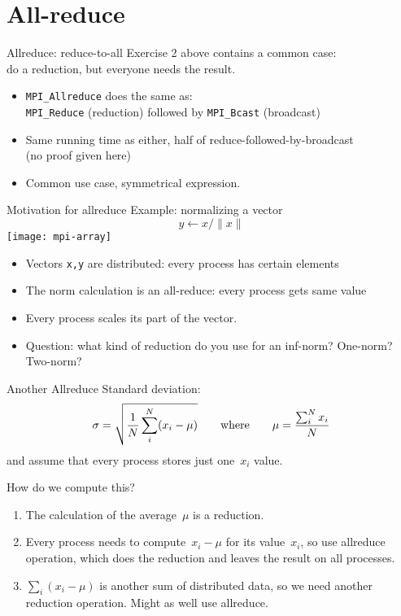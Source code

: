 
\begin{exerciseframe}
  
\end{exerciseframe}

\section{All-reduce}

\begin{numberedframe}{Allreduce: reduce-to-all}
  Exercise 2 above contains a common case:\\
  do a reduction, but everyone needs the result.
  \begin{itemize}
  \item \lstinline{MPI_Allreduce} does the same as:\\
    \lstinline{MPI_Reduce} (reduction) followed by \lstinline{MPI_Bcast} (broadcast)
  \item Same running time as either, half of reduce-followed-by-broadcast\\
    (no proof given here)
  \item Common use case, symmetrical expression.
  \end{itemize}
\end{numberedframe}

\begin{numberedframe}{Motivation for allreduce}
  Example: normalizing a vector
  \[ y \leftarrow x/\|x\| \]
  \texttt{[image: mpi-array]}
  \begin{itemize}
  \item Vectors \lstinline{x,y} are distributed: every process has certain
    elements
  \item The norm calculation is an all-reduce: every process gets same
    value
  \item Every process scales its part of the vector.
  \item Question: what kind of reduction do you use for an inf-norm? One-norm? Two-norm?
  \end{itemize}
\end{numberedframe}

\begin{numberedframe}{Another Allreduce}
Standard deviation:
\[ \sigma = \sqrt{\frac1N \sum_i^N (x_i-\mu) }
\qquad\hbox{where}\qquad \mu = \frac{\sum_i^Nx_i}N
\]
and assume that every process stores just one~$x_i$ value.

How do we compute this?
\begin{enumerate}
\item The calculation of the average~$\mu$ is a reduction.
\item Every
  process needs to compute~$x_i-\mu$ for its value~$x_i$, so use
  allreduce operation, which does the reduction and leaves
  the result on all processes.
\item $\sum_i(x_i-\mu)$ is another sum of
  distributed data, so we need another reduction operation. Might as
  well use allreduce.
\end{enumerate}
\end{numberedframe}

